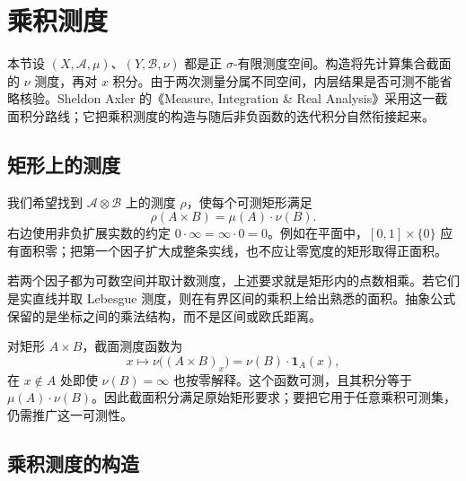\section{乘积测度}
\label{b1:sec:0702}

本节设 \((X,\mathcal A,\mu)\)、\((Y,\mathcal B,\nu)\) 都是正 \(\sigma\)-有限测度空间。构造将先计算集合截面的 \(\nu\) 测度，再对 \(x\) 积分。由于两次测量分属不同空间，内层结果是否可测不能省略核验。Sheldon Axler 的《Measure, Integration \& Real Analysis》\cite[Section 5A]{Axler2020Measure}采用这一截面积分路线；它把乘积测度的构造与随后非负函数的迭代积分自然衔接起来。

\subsection{矩形上的测度}
\label{b1:subsec:070201}

我们希望找到 \(\mathcal A\otimes\mathcal B\) 上的测度 \(\rho\)，使每个可测矩形满足
\[
\rho(A\times B)=\mu(A)\cdot\nu(B).
\]
右边使用非负扩展实数的约定 \(0\cdot\infty=\infty\cdot0=0\)。例如在平面中，\([0,1]\times\{0\}\) 应有面积零；把第一个因子扩大成整条实线，也不应让零宽度的矩形取得正面积。

\ProseParagraphBreak

若两个因子都为可数空间并取计数测度，上述要求就是矩形内的点数相乘。若它们是实直线并取 Lebesgue 测度，则在有界区间的乘积上给出熟悉的面积。抽象公式保留的是坐标之间的乘法结构，而不是区间或欧氏距离。

\ProseParagraphBreak

对矩形 \(A\times B\)，截面测度函数为
\[
x\longmapsto\nu\bigl((A\times B)_x\bigr)=\nu(B)\cdot\mathbf1_A(x),
\]
在 \(x\notin A\) 处即使 \(\nu(B)=\infty\) 也按零解释。这个函数可测，且其积分等于 \(\mu(A)\cdot\nu(B)\)。因此截面积分满足原始矩形要求；要把它用于任意乘积可测集，仍需推广这一可测性。

\subsection{乘积测度的构造}
\label{b1:subsec:070202}

